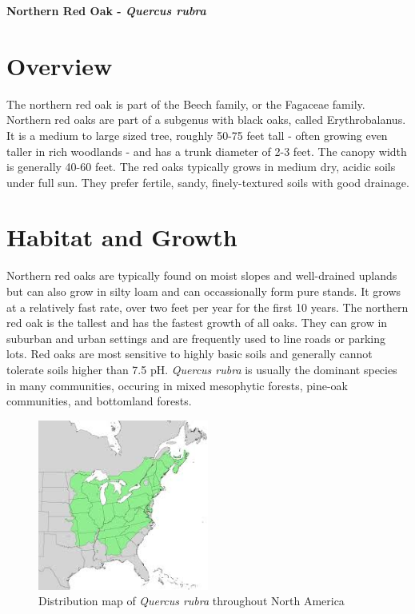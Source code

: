 \documentclass{article}\usepackage[]{graphicx}\usepackage[]{color}
\begin{document}
\renewcommand{\thetable}{\arabic{table}}
\renewcommand{\thefigure}{\arabic{figure}}
\renewcommand{\labelitemi}{$-$}
\begin{center}
{\huge\textbf{Northern Red Oak - {\textit{Quercus rubra}}}}
\end{center}
\section*{Overview}
The northern red oak is part of the Beech family, or the Fagaceae family. Northern red oaks are part of a subgenus with black oaks, called Erythrobalanus. It is a medium to large sized tree, roughly 50-75 feet tall - often growing even taller in rich woodlands - and has a trunk diameter of 2-3 feet. The canopy width is generally 40-60 feet. The red oaks typically grows in medium dry, acidic soils under full sun. They prefer fertile, sandy, finely-textured soils with good drainage. 
\section*{Habitat and Growth}
Northern red oaks are typically found on moist slopes and well-drained uplands but can also grow in silty loam and can occassionally form pure stands. It grows at a relatively fast rate, over two feet per year for the first 10 years. The northern red oak is the tallest and has the fastest growth of all oaks.  They can grow in suburban and urban settings and are frequently used to line roads or parking lots. Red oaks are most sensitive to highly basic soils and generally cannot tolerate soils higher than 7.5 pH. \textit{Quercus rubra} is usually the dominant species in many communities, occuring in mixed mesophytic forests, pine-oak communities, and bottomland forests. 
\begin{figure}[ht]
\includegraphics[width=0.5\textwidth]{qrubra_map.jpg}
\centering
\caption{Distribution map of \textit{Quercus rubra} throughout North America}
\end{figure}
\newpage
\end{document}
